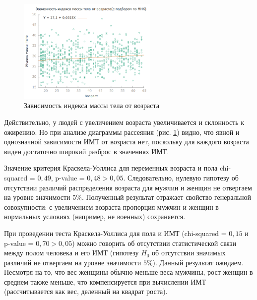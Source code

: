 \documentclass[a4paper,12pt]{article}
\begin{document}
\begin{figure}[H]
	\includegraphics[width=0.6\textwidth]{../[graphics]/bmi-age.png}
	\centering
	\caption{Зависимость индекса массы тела от возраста}
	\label{fig:bmi-age}
\end{figure}

Действительно, у людей с увеличением возраста увеличивается и склонность к ожирению. Но при анализе диаграммы рассеяния (рис. \ref{fig:bmi-age}) видно, что явной и однозначной зависимости ИМТ от возраста нет, поскольку для каждого возраста виден достаточно широкий разброс в значениях ИМТ.
	
Значение критерия Краскела-Уоллиса для переменных возраста и пола chi-squared = $0,49$, p-value = $0,48 > 0,05$. Следовательно, нулевую гипотезу об отсутствии различий распределения возраста для мужчин и женщин не отвергаем на уровне значимости $5\%$. Полученный результат отражает свойство генеральной совокупности: с увеличением возраста пропорция мужчин и женщин в нормальных условиях (например, не военных) сохраняется. 

При проведении теста Краскела-Уоллиса для пола и ИМТ (chi-squared = $0,15$ и p-value = $0,70 > 0,05$) можно говорить об отсутствии статистической связи между полом человека и его ИМТ (гипотезу $H_0$ об отсутствии значимых различий не отвергаем на уровне значимости $5\%$). Данный результат ожидаем. Несмотря на то, что вес женщины обычно меньше веса мужчины, рост женщин в среднем также меньше, что компенсируется при вычислении ИМТ (рассчитывается как вес, деленный на квадрат роста).

\end{document}
